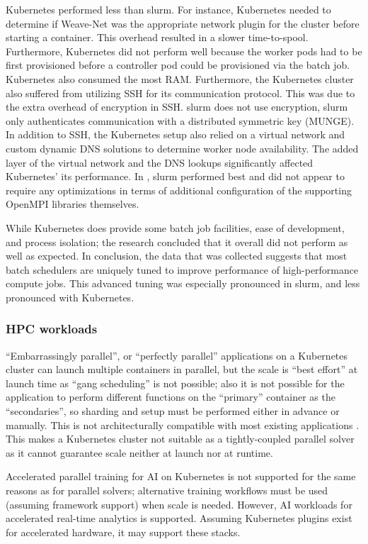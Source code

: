 \documentclass[12pt]{article}
\begin{document}
Kubernetes performed less than \gls{slurm}. For instance, Kubernetes needed to determine if Weave-Net was the appropriate network plugin for the cluster before starting a container. This overhead resulted in a slower time-to-spool. Furthermore, Kubernetes did not perform well because the worker pods had to be first provisioned before a controller pod could be provisioned via the batch job. Kubernetes also consumed the most RAM. Furthermore, the Kubernetes cluster also suffered from utilizing SSH for its communication protocol. This was due to the extra overhead of encryption in SSH. \gls{slurm} does not use encryption, \gls{slurm} only authenticates communication with a distributed symmetric key (MUNGE). In addition to SSH, the Kubernetes setup also relied on a virtual network and custom dynamic DNS solutions to determine worker node availability. The added layer of the virtual network and the DNS lookups significantly affected Kubernetes' its performance. In \cite{futral2019method}, \gls{slurm} performed best and did not appear to require any optimizations in terms of additional configuration of the supporting OpenMPI libraries themselves.

While Kubernetes does provide some batch job facilities, ease of development, and process isolation; the research concluded that it overall did not perform as well as expected. In conclusion, the data that was collected suggests that most batch schedulers are uniquely tuned to improve performance of high-performance compute jobs. This advanced tuning was especially pronounced in \gls{slurm}, and less pronounced with Kubernetes.

\subsubsection{HPC workloads}
``Embarrassingly parallel'', or ``perfectly parallel'' applications on a Kubernetes cluster can launch multiple containers in parallel, but the scale is ``best effort'' at launch time as ``gang scheduling'' is not possible; also it is not possible for the application to perform different functions on the ``primary'' container as the ``secondaries'', so sharding and setup must be performed either in advance or manually. This is not architecturally compatible with most existing applications \cite{hpc-on-kubernetes}. This makes a Kubernetes cluster not suitable as a tightly-coupled parallel solver as it cannot guarantee scale neither at launch nor at runtime.

Accelerated parallel training for AI on Kubernetes is not supported for the same reasons as for parallel solvers; alternative training workflows must be used (assuming framework support) when scale is needed. However, AI workloads for accelerated real-time analytics is supported. Assuming Kubernetes plugins exist for accelerated hardware, it may support these stacks.
\end{document}
